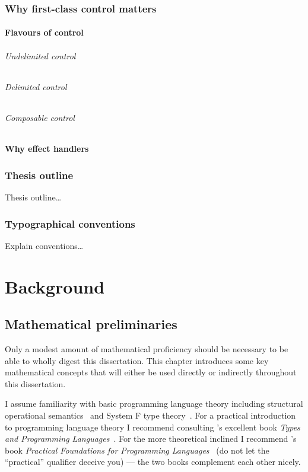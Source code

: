 \documentclass[12pt,phd,lfcs,twoside,openright,logo,leftchapter,normalheadings]{infthesis}
\theoremstyle{plain}
\theoremstyle{definition}
\begin{document}
\section{Why first-class control matters}

\subsection{Flavours of control}
\paragraph{Undelimited control}
\paragraph{Delimited control}
\paragraph{Composable control}

\subsection{Why effect handlers}

\section{Thesis outline}
Thesis outline\dots

\section{Typographical conventions}
Explain conventions\dots

\part{Background}
\label{p:background}

\chapter{Mathematical preliminaries}
\label{ch:maths-prep}

Only a modest amount of mathematical proficiency should be necessary
to be able to wholly digest this dissertation.
%
This chapter introduces some key mathematical concepts that will
either be used directly or indirectly throughout this dissertation.
%

I assume familiarity with basic programming language theory including
structural operational semantics~\cite{Plotkin04a} and System F type
theory~\cite{Girard72}. For a practical introduction to programming
language theory I recommend consulting \citeauthor{Pierce02}'s
excellent book \emph{Types and Programming
  Languages}~\cite{Pierce02}. For the more theoretical inclined I
recommend \citeauthor{Harper16}'s book \emph{Practical Foundations for
  Programming Languages}~\cite{Harper16} (do not let the ``practical''
qualifier deceive you) --- the two books complement each other nicely.
\end{document}
